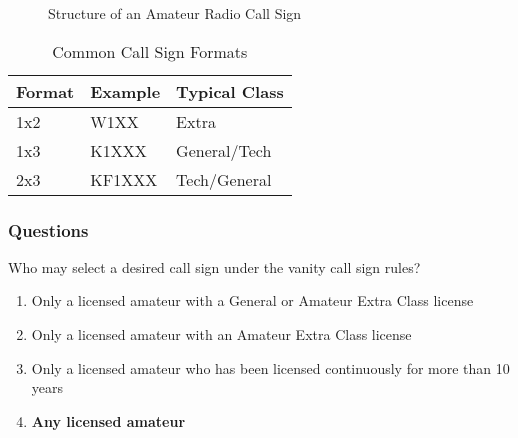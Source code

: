 \begin{figure}[h]
{
    }
    \caption{Structure of an Amateur Radio Call Sign}
    \label{fig:call-sign-structure}
\end{figure}

\begin{table}[h]
    \centering
    \begin{tabular}{|l|l|l|}
        \hline
        \textbf{Format} & \textbf{Example} & \textbf{Typical Class} \\
        \hline
        1x2 & W1XX & Extra \\
        1x3 & K1XXX & General/Tech \\
        2x3 & KF1XXX & Tech/General \\
        \hline
    \end{tabular}
    \caption{Common Call Sign Formats}
    \label{tab:call-sign-formats}
\end{table}

\subsubsection{Questions}

\begin{tcolorbox}[colback=gray!10!white,colframe=black!75!black,title={T1C02}]
    Who may select a desired call sign under the vanity call sign rules?
    \begin{enumerate}[label=\Alph*),noitemsep]
        \item Only a licensed amateur with a General or Amateur Extra Class license
        \item Only a licensed amateur with an Amateur Extra Class license
        \item Only a licensed amateur who has been licensed continuously for more than 10 years
        \item \textbf{Any licensed amateur}
    \end{enumerate}
\end{tcolorbox}

